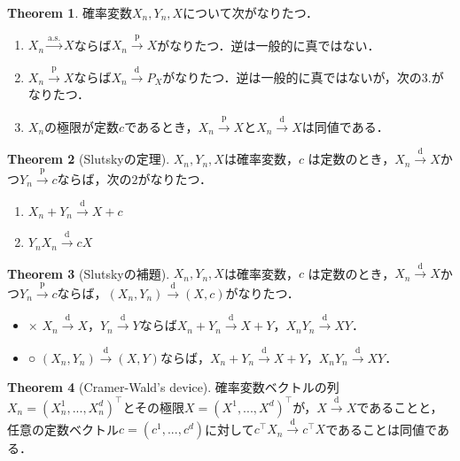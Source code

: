 \documentclass[a4paper,10pt]{jsarticle}
\theoremstyle{definition}
\newtheorem{theorem}{Theorem}
\newcommand{\items}[1]{\begin{itemize}#1\end{itemize}}
\newcommand{\enums}[1]{\begin{enumerate}#1\end{enumerate}}
\begin{document}
\begin{theorem}確率変数$X_n,Y_n,X$について次がなりたつ．
\enums{
	\item $X_n\overset{\text{a.s.}}{\rightarrow}X$ならば$X_n\overset{\text{p}}{\rightarrow}X$がなりたつ．逆は一般的に真ではない．
	\item $X_n\overset{\text{p}}{\rightarrow}X$ならば$X_n\overset{\text{d}}{\rightarrow}P_X$がなりたつ．逆は一般的に真ではないが，次の3.がなりたつ．
	\item $X_n$の極限が定数$c$であるとき，$X_n\overset{\text{p}}{\rightarrow}X$と$X_n\overset{\text{d}}{\rightarrow}X$は同値である．}
\end{theorem}\begin{theorem}[Slutskyの定理]
$X_n,Y_n,X$は確率変数，$c$ は定数のとき，$X_n\overset{\text{d}}{\rightarrow}X$かつ$Y_n\overset{\text{p}}{\rightarrow}c$ならば，次の$2$がなりたつ．
\enums{	
	\item $X_n+Y_n\overset{\text{d}}{\rightarrow}X+c$
	\item $Y_nX_n\overset{\text{d}}{\rightarrow}cX$}
\end{theorem}
\begin{theorem}[Slutskyの補題]
$X_n,Y_n,X$は確率変数，$c$ は定数のとき，$X_n\overset{\text{d}}{\rightarrow}X$かつ$Y_n\overset{\text{p}}{\rightarrow}c$ならば，$(X_n,Y_n)\overset{\text{d}}{\rightarrow}(X,c)$がなりたつ．
\end{theorem}
\items{
	\item[×]$X_n\overset{\text{d}}{\rightarrow}X$，$Y_n\overset{\text{d}}{\rightarrow}Y$ならば$X_n+Y_n\overset{\text{d}}{\rightarrow}X+Y$，$X_nY_n\overset{\text{d}}{\rightarrow}XY$．
	\item[○]$(X_n,Y_n)\overset{\text{d}}{\rightarrow}(X,Y)$ならば，$X_n+Y_n\overset{\text{d}}{\rightarrow}X+Y$，$X_nY_n\overset{\text{d}}{\rightarrow}XY$．}
\begin{theorem}[Cramer-Wald's device]
確率変数ベクトルの列$X_n=(X_n^1,...,X_n^d)^\top$とその極限$X=(X^1,...,X^d)^\top$が，$X\overset{\text{d}}{\rightarrow}X$であることと，
任意の定数ベクトル$c=(c^1,...,c^d)$に対して$c^\top X_n\overset{\text{d}}{\rightarrow}c^\top X$であることは同値である．
\end{theorem}
\end{document}
